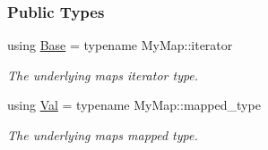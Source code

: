 \subsubsection*{Public Types}
\begin{DoxyCompactItemize}
\item 
using \hyperlink{structslb_1_1core_1_1util_1_1MapValIterator_aad1e93b1dc7d5a619b934a40d8c02a16}{Base} = typename My\+Map\+::iterator\hypertarget{structslb_1_1core_1_1util_1_1MapValIterator_aad1e93b1dc7d5a619b934a40d8c02a16}{}\label{structslb_1_1core_1_1util_1_1MapValIterator_aad1e93b1dc7d5a619b934a40d8c02a16}

\begin{DoxyCompactList}\small\item\em The underlying map\textquotesingle{}s iterator type. \end{DoxyCompactList}\item 
using \hyperlink{structslb_1_1core_1_1util_1_1MapValIterator_a35a32ef07d77b5441cd9afea0a975012}{Val} = typename My\+Map\+::mapped\+\_\+type\hypertarget{structslb_1_1core_1_1util_1_1MapValIterator_a35a32ef07d77b5441cd9afea0a975012}{}\label{structslb_1_1core_1_1util_1_1MapValIterator_a35a32ef07d77b5441cd9afea0a975012}

\begin{DoxyCompactList}\small\item\em The underlying map\textquotesingle{}s mapped type. \end{DoxyCompactList}\end{DoxyCompactItemize}
